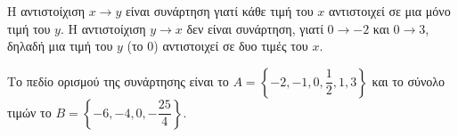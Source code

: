 
\begin{alist}
\item Η αντιστοίχιση $x \rightarrow y$ είναι συνάρτηση γιατί κάθε τιμή του $x$ αντιστοιχεί σε μια μόνο
τιμή του $y$. Η αντιστοίχιση $y \rightarrow x$ δεν είναι συνάρτηση, γιατί $0 \rightarrow -2$ και $0 \rightarrow 3$, δηλαδή
μια τιμή του $y$ (το $0$) αντιστοιχεί σε δυο τιμές του $x$.

\item Το πεδίο ορισμού της συνάρτησης είναι το $A = \left\{-2, -1, 0, \dfrac{1}{2}, 1, 3\right\}$ και το σύνολο τιμών το
$B = \left\{-6, -4, 0, -\dfrac{25}{4}\right\}.$
\end{alist}

